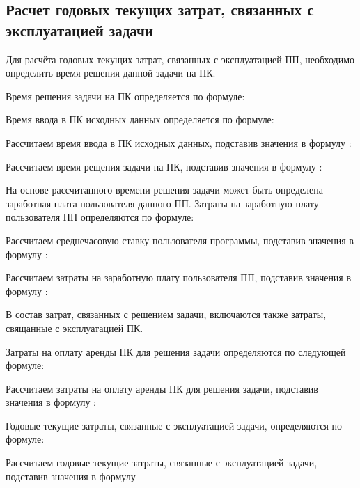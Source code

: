\subsection{Расчет годовых текущих затрат, связанных с эксплуатацией задачи}
\label{sec:economics:manualTotalExpenses}

Для расчёта годовых текущих затрат, связанных с эксплуатацией ПП, необходимо определить время решения данной задачи на ПК.

Время решения задачи на ПК определяется по формуле:
\pcTaskAccomplishTimeCostEquation

Время ввода в ПК исходных данных определяется по формуле:
\manualInputTimeEquation

Рассчитаем время ввода в ПК исходных данных, подставив значения в формулу :
\manualInputTimeFormulaApplied

Рассчитаем время рещения задачи на ПК, подставив значения в формулу :
\pcTaskAccomplishTimeCostFormulaApplied

На основе рассчитанного времени решения задачи может быть определена заработная плата пользователя данного ПП. Затраты на заработную плату пользователя ПП определяются по формуле:
\userSalaryEquation

Рассчитаем среднечасовую ставку пользователя программы, подставив значения в формулу :
\userRateFormulaApplied

Рассчитаем затраты на заработную плату пользователя ПП, подставив значения в формулу :
\userSalaryFormulaApplied

В состав затрат, связанных с решением задачи, включаются также затраты, свящанные с эксплуатацией ПК.

Затраты на оплату аренды ПК для решения задачи определяются по следующей формуле:
\userPCRentCostEquation

Рассчитаем затраты на оплату аренды ПК для решения задачи, подставив значения в формулу :
\userPCRentCostFormulaApplied

Годовые текущие затраты, связанные с эксплуатацией задачи, определяются по формуле:
\annualExpensesEquation

Рассчитаем годовые текущие затраты, связанные с эксплуатацией задачи, подставив значения в формулу 
\annualExpensesFormulaApplied